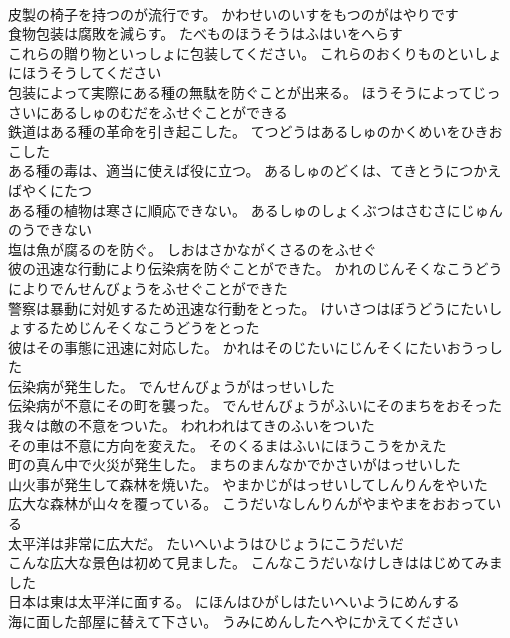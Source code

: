 \documentclass[8pt]{extreport}
\begin{document}
\begin{CJK}{UTF8}{min}
\\	皮製の椅子を持つのが流行です。	かわせいのいすをもつのがはやりです 
\\	食物包装は腐敗を減らす。	たべものほうそうはふはいをへらす 
\\	これらの贈り物といっしょに包装してください。	これらのおくりものといしょにほうそうしてください 
\\	包装によって実際にある種の無駄を防ぐことが出来る。	ほうそうによってじっさいにあるしゅのむだをふせぐことができる 
\\	鉄道はある種の革命を引き起こした。	てつどうはあるしゅのかくめいをひきおこした 
\\	ある種の毒は、適当に使えば役に立つ。	あるしゅのどくは、てきとうにつかえばやくにたつ 
\\	ある種の植物は寒さに順応できない。	あるしゅのしょくぶつはさむさにじゅんのうできない 
\\	塩は魚が腐るのを防ぐ。	しおはさかながくさるのをふせぐ 
\\	彼の迅速な行動により伝染病を防ぐことができた。	かれのじんそくなこうどうによりでんせんびょうをふせぐことができた 
\\	警察は暴動に対処するため迅速な行動をとった。	けいさつはぼうどうにたいしょするためじんそくなこうどうをとった 
\\	彼はその事態に迅速に対応した。	かれはそのじたいにじんそくにたいおうっした 
\\	伝染病が発生した。	でんせんびょうがはっせいした 
\\	伝染病が不意にその町を襲った。	でんせんびょうがふいにそのまちをおそった 
\\	我々は敵の不意をついた。	われわれはてきのふいをついた 
\\	その車は不意に方向を変えた。	そのくるまはふいにほうこうをかえた 
\\	町の真ん中で火災が発生した。	まちのまんなかでかさいがはっせいした 
\\	山火事が発生して森林を焼いた。	やまかじがはっせいしてしんりんをやいた 
\\	広大な森林が山々を覆っている。	こうだいなしんりんがやまやまをおおっている 
\\	太平洋は非常に広大だ。	たいへいようはひじょうにこうだいだ 
\\	こんな広大な景色は初めて見ました。	こんなこうだいなけしきははじめてみました 
\\	日本は東は太平洋に面する。	にほんはひがしはたいへいようにめんする 
\\	海に面した部屋に替えて下さい。	うみにめんしたへやにかえてください 

\end{CJK}
\end{document}
